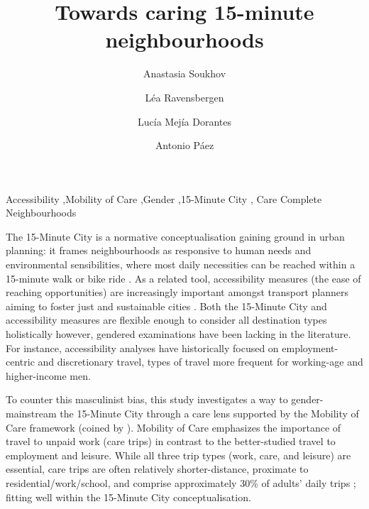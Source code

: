 \documentclass[
  authoryear,
  preprint,
  3p]{elsarticle}
\begin{document}
\begin{frontmatter}
\title{Towards caring 15-minute neighbourhoods}
\author[1]{Anastasia Soukhov%
%
}
\author[1]{Léa Ravensbergen%
%
}
\author[2]{Lucía Mejía Dorantes%
%
}
\author[1]{Antonio Páez%
%
}






        





\begin{keyword}
    Accessibility \sep Mobility of Care \sep Gender \sep 15-Minute
City \sep 
    Care Complete Neighbourhoods
\end{keyword}
\end{frontmatter}
    \ifdefined\Shaded\renewenvironment{Shaded}{\begin{tcolorbox}[interior hidden, boxrule=0pt, enhanced, sharp corners, breakable, borderline west={3pt}{0pt}{shadecolor}, frame hidden]}{\end{tcolorbox}}\fi

The 15-Minute City is a normative conceptualisation gaining ground in
urban planning: it frames neighbourhoods as responsive to human needs
and environmental sensibilities, where most daily necessities can be
reached within a 15-minute walk or bike ride \citep{Allam2022}. As a
related tool, accessibility measures (the ease of reaching
opportunities) are increasingly important amongst transport planners
aiming to foster just and sustainable cities
\citep{vale2023accessibility}. Both the 15-Minute City and accessibility
measures are flexible enough to consider all destination types
holistically however, gendered examinations have been lacking in the
literature. For instance, accessibility analyses have historically
focused on employment-centric and discretionary travel, types of travel
more frequent for working-age and higher-income men.

To counter this masculinist bias, this study investigates a way to
gender-mainstream the 15-Minute City through a care lens
\citep[e.g.,][]{lawWomenTransportNew1999, uteng2008gendered, Oestergaard1992, levy1991towards, levy2013travel}
supported by the Mobility of Care framework (coined by
\citet{sanchezdemadariagaMobilityCareIntroducing2013}). Mobility of Care
emphasizes the importance of travel to unpaid work (care trips) in
contrast to the better-studied travel to employment and leisure. While
all three trip types (work, care, and leisure) are essential, care trips
are often relatively shorter-distance, proximate to
residential/work/school, and comprise approximately 30\% of adults'
daily trips
\citep{sanchezdemadariagaMeasuringMobilitiesCare2019, ravensbergen2023exploratory, mejia2021mobility};
fitting well within the 15-Minute City conceptualisation.
\end{document}
